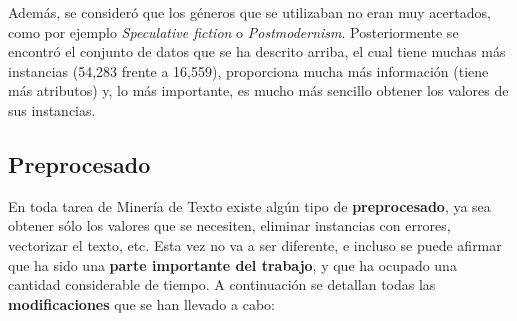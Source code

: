 \documentclass[12pt,a4paper, xcolor=table]{article}
\begin{document}
    \vspace{1mm}

    Además, se consideró que los géneros que se utilizaban no eran muy acertados, como por ejemplo \textit{Speculative fiction} o \textit{Postmodernism}. Posteriormente se encontró el conjunto de datos que se ha descrito arriba, el cual tiene muchas más instancias (54,283 frente a 16,559), proporciona mucha más información (tiene más atributos) y, lo más importante, es mucho más sencillo obtener los valores de sus instancias.

    \subsection{Preprocesado}
        En toda tarea de Minería de Texto existe algún tipo de \textbf{preprocesado}, ya sea obtener sólo los valores que se necesiten, eliminar instancias con errores, vectorizar el texto, etc. Esta vez no va a ser diferente, e incluso se puede afirmar que ha sido una \textbf{parte importante del trabajo}, y que ha ocupado una cantidad considerable de tiempo. A continuación se detallan todas las \textbf{modificaciones} que se han llevado a cabo:
\end{document}
